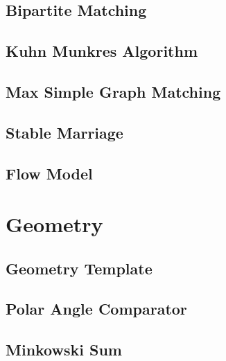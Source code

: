 \documentclass[a4paper,10pt,oneside]{article}
\begin{document}
\subsection{Bipartite Matching}


\subsection{Kuhn Munkres Algorithm}


\subsection{Max Simple Graph Matching}


\subsection{Stable Marriage}


\subsection{Flow Model}


\section{Geometry}

\subsection{Geometry Template}


%

\subsection{Polar Angle Comparator}


\subsection{Minkowski Sum}

\end{document}
